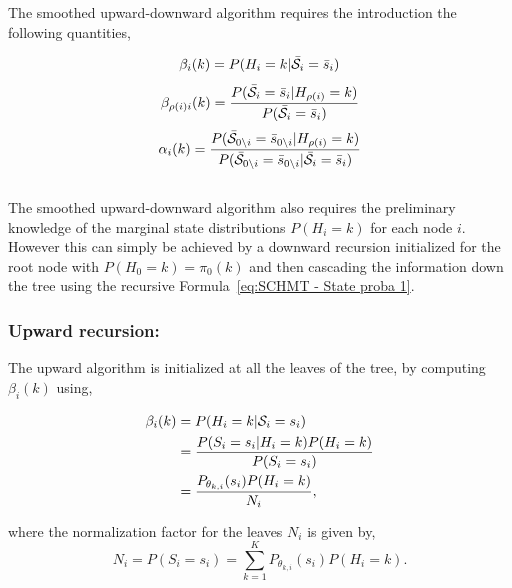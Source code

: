 \documentclass[a4paper,11pt]{report}
\begin{document}
			The smoothed upward-downward algorithm requires the introduction the following quantities,
			
			\begin{equation}
			  \beta_{i}(k) = P(H_{i}=k | \bar{\mathcal{S}}_{i}= \bar{s}_{i})
			  \label{eq:UD beta node}
			\end{equation}
			\begin{equation}
			  \beta_{\rho(i)i}(k) = \frac{P(\bar{\mathcal{S}}_{i}= \bar{s}_{i} | H_{\rho(i)}=k)} {P(\bar{\mathcal{S}}_{i}= \bar{s}_{i}) }
			  \label{eq:UD beta node and parents}
			\end{equation}
						\begin{equation}
			  \alpha_{i}(k) = \frac{P(\bar{\mathcal{S}}_{0\backslash i}= \bar{s}_{0\backslash i} | H_{\rho(i)}=k)} {P(\bar{\mathcal{S}}_{0\backslash i}= \bar{s}_{0\backslash i} | \bar{\mathcal{S}}_{i}= \bar{s}_{i} ) }
			  \label{eq:UD alpha}
			\end{equation}\\
			
			The smoothed upward-downward algorithm also requires the preliminary knowledge  of the marginal state distributions $P(H_{i}=k)$ for each node $i$. However this can simply be achieved by a downward recursion initialized for the root node with $P(H_{0}=k)=\pi_{0}(k)$ and then cascading the information down the tree using the recursive Formula~\ref{eq:SCHMT - State proba 1}.
			
			\subsubsection{Upward recursion:}
				\label{subsubsec:SCHMT/Learning/E/Up}
				The upward algorithm is initialized at all the leaves of the tree, by computing $\beta_{i}(k)$ using,
				
				\begin{equation}
					\begin{split}
						\beta_{i}(k)	&= P(H_{i}=k | \mathcal{S}_{i}= s_{i})\\
													&= \frac{P(S_{i}= s_{i} | H_{i}=k)P(H_{i}=k)} {P(S_{i}= s_{i})}\\
													&= \frac{P_{\theta_{k,i}}(s_{i}) P(H_{i}=k)} {N_{i}},
						\end{split}
						\label{eq:upward beta leaf}
				\end{equation}
				
				where the normalization factor for the leaves $N_{i}$ is given by,
				\begin{equation}
					N_{i}	= P(S_{i}= s_{i}) = \sum_{k=1}^{K} P_{\theta_{k,i}}(s_{i}) P(H_{i}=k).
					\label{eq:upward normalization leaf}
				\end{equation}
				
\end{document}
